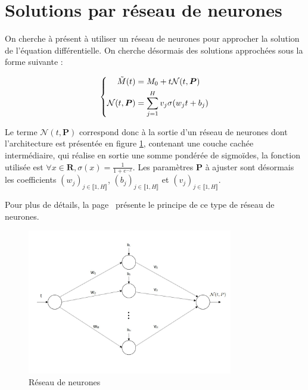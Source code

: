 \documentclass[12pt]{report}
\begin{document}
\section{Solutions par réseau de neurones}

On cherche à présent à utiliser un réseau de neurones pour approcher la solution de l'équation différentielle. On cherche désormais des solutions approchées sous la forme suivante :

\begin{equation}
\left\{
    \begin{aligned}
        \Tilde{M}(t) &= M_0 + t{\mathcal{N}}(t,\bm{P}) \\
        {\mathcal{N}}(t,\bm{P}) &= \sum_{j=1}^{H} v_j \sigma(w_jt+b_j)
    \end{aligned}
\right.
\label{eq:solution NN}
\end{equation}

Le terme ${\mathcal{N}}(t,\bm{P})$ correspond donc à la sortie d'un réseau de neurones dont l'architecture est présentée en figure \ref{fig:NN}, contenant une couche cachée intermédiaire, qui réalise en sortie une somme pondérée de sigmoïdes, la fonction utilisée est ${\displaystyle{\forall x \in \mathbf{R}, \sigma(x) = \frac{1}{1+e^{-x}}}}$. Les paramètres $\bm{P}$ à ajuster sont désormais les coefficients $(w_j)_{j\in \llbracket 1,H \rrbracket}$, $(b_j)_{j\in \llbracket 1,H \rrbracket}$ et $(v_j)_{j\in \llbracket 1,H \rrbracket}$.

Pour plus de détails, la page~\cite{WikiNN} présente le principe de ce type de réseau de neurones.
\begin{figure}
\centering
\includegraphics[width=0.8\textwidth]{NN.jpg}
\caption{\label{fig:NN}Réseau de neurones}
\end{figure}
\end{document}
